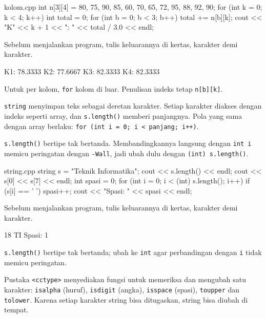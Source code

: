\documentclass[a4paper]{article}
\begin{document}
\begin{MKode}{kolom.cpp}
int n[3][4] = {{80, 75, 90, 85},
               {60, 70, 65, 72},
               {95, 88, 92, 90}};
for (int k = 0; k < 4; k++) {
    int total = 0;
    for (int b = 0; b < 3; b++) total += n[b][k];
    cout << "K" << k + 1 << ": " << total / 3.0 << endl;
}
\end{MKode}
\begin{Tebak}[]
Sebelum menjalankan program, tulis keluarannya di kertas, karakter demi karakter.
\end{Tebak}
\begin{Jawaban}[]
\begin{MKeluaran}[]
K1: 78.3333
K2: 77.6667
K3: 82.3333
K4: 82.3333
\end{MKeluaran}
Untuk per kolom, \texttt{for} kolom di luar. Penulisan indeks tetap \texttt{n[b][k]}.
\end{Jawaban}
\texttt{string} menyimpan teks sebagai deretan karakter. Setiap karakter diakses dengan indeks seperti array, dan \texttt{s.length()} memberi panjangnya. Pola yang sama dengan array berlaku: \texttt{for (int i = 0; i < panjang; i++)}.

\texttt{s.length()} bertipe tak bertanda. Membandingkannya langsung dengan \texttt{int i} memicu peringatan dengan \texttt{-Wall}, jadi ubah dulu dengan \texttt{(int) s.length()}.

\begin{MKode}{string.cpp}
string s = "Teknik Informatika";
cout << s.length() << endl;
cout << s[0] << s[7] << endl;
int spasi = 0;
for (int i = 0; i < (int) s.length(); i++) {
    if (s[i] == ' ') spasi++;
}
cout << "Spasi: " << spasi << endl;
\end{MKode}
\begin{Tebak}[]
Sebelum menjalankan program, tulis keluarannya di kertas, karakter demi karakter.
\end{Tebak}
\begin{Jawaban}[]
\begin{MKeluaran}[]
18
TI
Spasi: 1
\end{MKeluaran}
\texttt{s.length()} bertipe tak bertanda; ubah ke \texttt{int} agar perbandingan dengan \texttt{i} tidak memicu peringatan.
\end{Jawaban}
Pustaka \texttt{<cctype>} menyediakan fungsi untuk memeriksa dan mengubah satu karakter: \texttt{isalpha} (huruf), \texttt{isdigit} (angka), \texttt{isspace} (spasi), \texttt{toupper} dan \texttt{tolower}. Karena setiap karakter string bisa ditugaskan, string bisa diubah di tempat.
\end{document}
